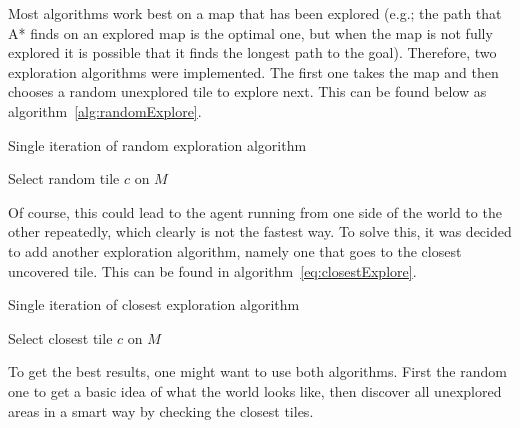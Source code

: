 Most algorithms work best on a map that has been explored (e.g.; the path that A* finds on an explored map is the optimal one, but when the map is not fully explored it is possible that it finds the longest path to the goal). Therefore, two exploration algorithms were implemented. The first one takes the map and then chooses a random unexplored tile to explore next. This can be found below as algorithm~\ref{alg:randomExplore}.

\begin{algorithm}
    \label{alg:randomExplore}
    \caption{Single iteration of random exploration algorithm}
    Select random tile $c$ on $M$\;
\end{algorithm}

Of course, this could lead to the agent running from one side of the world to the other repeatedly, which clearly is not the fastest way. To solve this, it was decided to add another exploration algorithm, namely one that goes to the closest uncovered tile. This can be found in algorithm~\ref{eq:closestExplore}.

\begin{algorithm}
    \label{eq:closestExplore}
    \caption{Single iteration of closest exploration algorithm}
    Select closest tile $c$ on $M$\;
\end{algorithm}

To get the best results, one might want to use both algorithms. First the random one to get a basic idea of what the world looks like, then discover all unexplored areas in a smart way by checking the closest tiles.